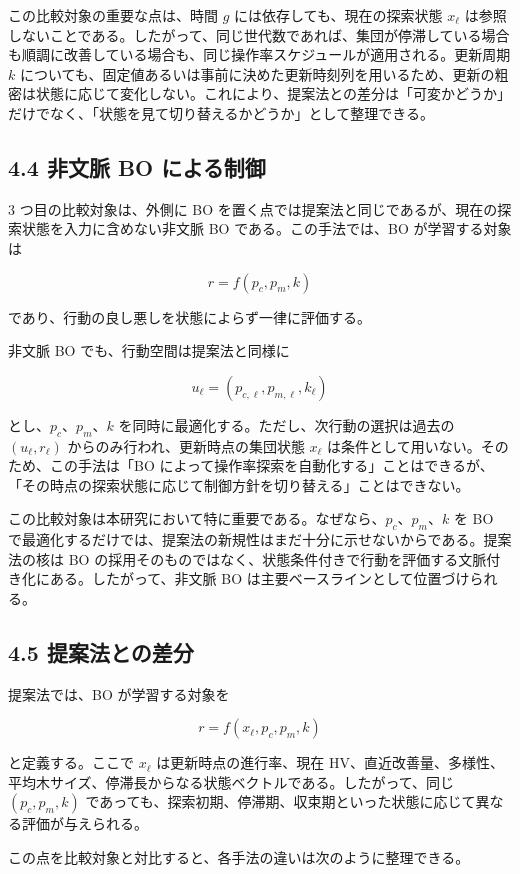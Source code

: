 この比較対象の重要な点は、時間 $g$ には依存しても、現在の探索状態 $x_\ell$ は参照しないことである。したがって、同じ世代数であれば、集団が停滞している場合も順調に改善している場合も、同じ操作率スケジュールが適用される。更新周期 $k$ についても、固定値あるいは事前に決めた更新時刻列を用いるため、更新の粗密は状態に応じて変化しない。これにより、提案法との差分は「可変かどうか」だけでなく、「状態を見て切り替えるかどうか」として整理できる。

\subsection{4.4 非文脈 BO による制御}


3 つ目の比較対象は、外側に BO を置く点では提案法と同じであるが、現在の探索状態を入力に含めない非文脈 BO である。この手法では、BO が学習する対象は

\[
r = f(p_c,p_m,k)
\]

であり、行動の良し悪しを状態によらず一律に評価する。

非文脈 BO でも、行動空間は提案法と同様に

\[
u_\ell = (p_{c,\ell}, p_{m,\ell}, k_\ell)
\]

とし、$p_c$、$p_m$、$k$ を同時に最適化する。ただし、次行動の選択は過去の $(u_\ell, r_\ell)$ からのみ行われ、更新時点の集団状態 $x_\ell$ は条件として用いない。そのため、この手法は「BO によって操作率探索を自動化する」ことはできるが、「その時点の探索状態に応じて制御方針を切り替える」ことはできない。

この比較対象は本研究において特に重要である。なぜなら、$p_c$、$p_m$、$k$ を BO で最適化するだけでは、提案法の新規性はまだ十分に示せないからである。提案法の核は BO の採用そのものではなく、状態条件付きで行動を評価する文脈付き化にある。したがって、非文脈 BO は主要ベースラインとして位置づけられる。

\subsection{4.5 提案法との差分}


提案法では、BO が学習する対象を

\[
r = f(x_\ell,p_c,p_m,k)
\]

と定義する。ここで $x_\ell$ は更新時点の進行率、現在 HV、直近改善量、多様性、平均木サイズ、停滞長からなる状態ベクトルである。したがって、同じ $(p_c,p_m,k)$ であっても、探索初期、停滞期、収束期といった状態に応じて異なる評価が与えられる。

この点を比較対象と対比すると、各手法の違いは次のように整理できる。

